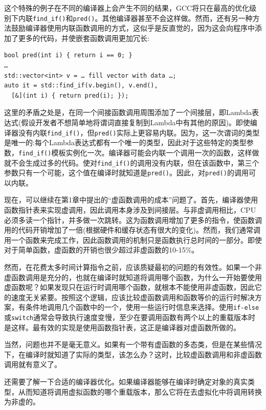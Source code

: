 这个特殊的例子在不同的编译器上会产生不同的结果，GCC将只在最高的优化级别下内联\texttt{find\_if()}和\texttt{pred()}。其他编译器甚至不会这样做。然而，还有另一种方法鼓励编译器使用内联函数调用的方式，这似乎是反直觉的，因为这会向程序中添加了更多的代码，并使嵌套函数调用更加冗长:

\begin{lstlisting}[style=styleCXX]
bool pred(int i) { return i == 0; }
… 
std::vector<int> v = … fill vector with data …;
auto it = std::find_if(v.begin(), v.end(), 
  [&](int i) { return pred(i); });
\end{lstlisting}

这里的矛盾之处是，在同一个间接函数调用周围添加了一个间接层，即Lambda表达式(假设开发者不想简单地将谓词直接复制到Lambda中有其他的原因)。即使编译器没有内联\texttt{find\_if()}，但\texttt{pred()}实际上更容易内联。因为，这一次谓词的类型是唯一的:每个Lambda表达式都有一个唯一的类型，因此对于这些特定的类型参数，\texttt{find\_if()}模板实例化一次。编译器可能会内联一个调用一次的函数，这样做就不会生成过多的代码。使对\texttt{find\_if()}的调用没有内联，但在该函数中，第三个参数只有一个可能，这个值在编译时就知道是\texttt{pred()}。因此，对\texttt{pred()}的调用可以内联。

现在，可以继续在第1章中提出的“虚函数调用的成本”问题了。首先，编译器使用函数指针表来实现虚调用，因此调用本身涉及到间接层。与非虚调用相比，CPU必须多读一个指针，并多做一次跳转。这为函数调用增加了更多的指令，使函数调用的代码开销增加了一倍(根据硬件和缓存状态有很大的变化)。然而，我们通常调用一个函数来完成工作，因此函数调用的机制只是函数执行总时间的一部分。即使对于简单函数，虚函数的开销也很少超过非虚函数的10-15\%。

然而，在花费太多时间计算指令之前，应该质疑最初的问题的有效性。如果一个非虚函数调用是充分的，也就在编译时就知道将调用哪个函数，为什么一开始要使用虚函数呢？如果发现只在运行时调用哪个函数，就根本不能使用非虚函数，因此它的速度无关紧要。按照这个逻辑，应该比较虚函数调用和函数等价的运行时解决方案，有条件地调用几个函数中的一个，使用一些运行时信息来选择。使用\texttt{if-else}或\texttt{switch}通常会导致执行速度变慢，至少在要调用函数有两个以上的重载版本时是这样。最有效的实现是使用函数指针表，这正是编译器对虚函数所做的。

当然，问题也并不是毫无意义。如果有一个带有虚函数的多态类，但是在某些情况下，在编译时就知道了实际的类型，该怎么办？这时，比较虚函数调用和非虚函数调用就有意义了。

还需要了解一下合适的编译器优化。如果编译器能够在编译时确定对象的真实类型，从而知道将调用虚拟函数的哪个重载版本，那么它将在去虚拟化中将调用转换为非虚的。

